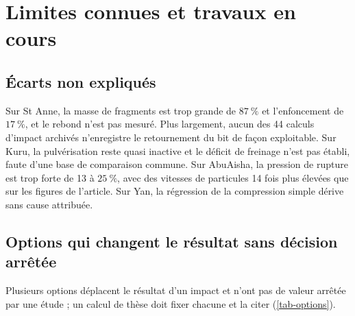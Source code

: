 \section{Limites connues et travaux en cours}
\label{sec-limites}

\subsection{Écarts non expliqués}

Sur St Anne, la masse de fragments est trop grande de $87~\%$ et l'enfoncement de $17~\%$, et le rebond n'est pas mesuré. Plus largement, aucun des 44 calculs d'impact archivés n'enregistre le retournement du bit de façon exploitable. Sur Kuru, la pulvérisation reste quasi inactive et le déficit de freinage n'est pas établi, faute d'une base de comparaison commune. Sur AbuAisha, la pression de rupture est trop forte de 13 à $25~\%$, avec des vitesses de particules 14 fois plus élevées que sur les figures de l'article. Sur Yan, la régression de la compression simple dérive sans cause attribuée.

\subsection{Options qui changent le résultat sans décision arrêtée}

Plusieurs options déplacent le résultat d'un impact et n'ont pas de valeur arrêtée par une étude ; un calcul de thèse doit fixer chacune et la citer (\cref{tab-options}).


